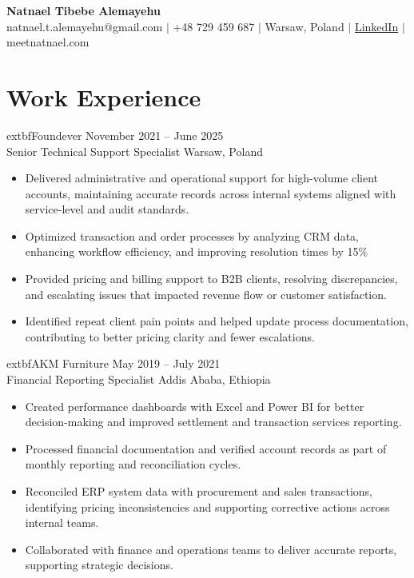 \documentclass[letterpaper,11pt]{article}
\begin{document}
\begin{center}
    {\Huge \textbf{Natnael Tibebe Alemayehu}} \\ \vspace{2pt}
    natnael.t.alemayehu@gmail.com $|$ +48 729 459 687 $|$ Warsaw, Poland $|$ \href{https://www.linkedin.com/in/natnaeltalemayehu/}{LinkedIn} $|$ meetnatnael.com
\end{center}

\section*{Work Experience}

  extbf{Foundever} \hfill November 2021 -- June 2025 \\
Senior Technical Support Specialist \hfill Warsaw, Poland \\
\begin{itemize}
    \item Delivered administrative and operational support for high-volume client accounts, maintaining accurate records across internal systems aligned with service-level and audit standards.
    \item Optimized transaction and order processes by analyzing CRM data, enhancing workflow efficiency, and improving resolution times by 15\%
    \item Provided pricing and billing support to B2B clients, resolving discrepancies, and escalating issues that impacted revenue flow or customer satisfaction.
    \item Identified repeat client pain points and helped update process documentation, contributing to better pricing clarity and fewer escalations.
\end{itemize}

  extbf{AKM Furniture} \hfill May 2019 -- July 2021 \\
Financial Reporting Specialist \hfill Addis Ababa, Ethiopia \\
\begin{itemize}
    \item Created performance dashboards with Excel and Power BI for better decision-making and improved settlement and transaction services reporting.
    \item Processed financial documentation and verified account records as part of monthly reporting and reconciliation cycles.
    \item Reconciled ERP system data with procurement and sales transactions, identifying pricing inconsistencies and supporting corrective actions across internal teams.
    \item Collaborated with finance and operations teams to deliver accurate reports, supporting strategic decisions.
\end{itemize}
\end{document}
